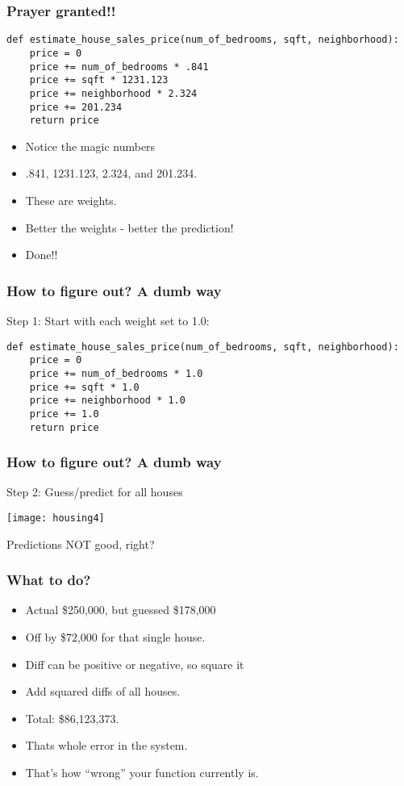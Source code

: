 \begin{frame}[fragile]\frametitle{Prayer granted!!}
\begin{lstlisting}
def estimate_house_sales_price(num_of_bedrooms, sqft, neighborhood):
	price = 0
	price += num_of_bedrooms * .841
	price += sqft * 1231.123
	price += neighborhood * 2.324
	price += 201.234
	return price
\end{lstlisting}
	\begin{itemize}
	\item Notice the magic numbers
	\item .841, 1231.123, 2.324, and 201.234. 
	\item These are weights. 
	\item Better the weights - better the prediction!
	\item Done!!
	\end{itemize}
\end{frame}

\begin{frame}[fragile]\frametitle{How to figure out? A dumb way}
Step 1: Start with each weight set to 1.0:
\begin{lstlisting}
def estimate_house_sales_price(num_of_bedrooms, sqft, neighborhood):
	price = 0
	price += num_of_bedrooms * 1.0
	price += sqft * 1.0
	price += neighborhood * 1.0
	price += 1.0
	return price
\end{lstlisting}
\end{frame}

\begin{frame}[fragile]\frametitle{How to figure out? A dumb way}
Step 2: Guess/predict for all houses 
\begin{center}
\texttt{[image: housing4]}
\end{center}
Predictions NOT good, right?
\end{frame}

\begin{frame}[fragile]\frametitle{What to do?}
	\begin{itemize}
	\item Actual \$250,000, but guessed \$178,000
	\item Off by \$72,000 for that single house.
	\item Diff can be positive or negative, so square it
	\item Add squared diffs of all houses.
	\item Total: \$86,123,373. 
	\item Thats whole error in the system.
	\item That's how ``wrong'' your function currently is.
	\end{itemize}
\end{frame}


